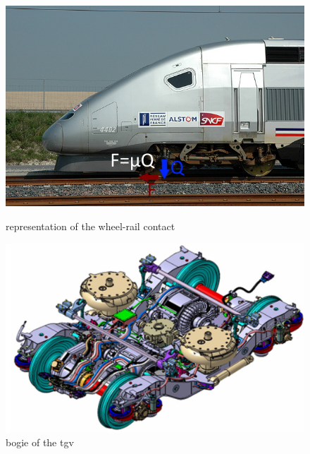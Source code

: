 \documentclass[12pt, a4paper, onecolumn]{article}
\begin{document}
\begin{figure}[H]
  \centering
  \begin{minipage}{0.5\textwidth}
    \includegraphics[width=\textwidth]
    {img/adherence.jpg}
    \caption{representation of the wheel-rail contact}
    \label{adherence}
  \end{minipage}\hfill
  \begin{minipage}{0.5\textwidth}
    \includegraphics[width=\textwidth]
    {img/bogietrain.png}
    \caption{bogie of the tgv}
    \label{bogietrain}
  \end{minipage}
\end{figure}



\pagebreak %
\end{document}
